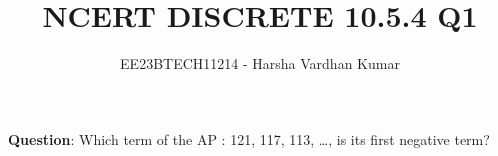 \documentclass[journal,12pt,twocolumn]{IEEEtran}
\title{NCERT DISCRETE 10.5.4 Q1}
\author{EE23BTECH11214 - Harsha Vardhan Kumar}
\begin{document}
\maketitle
\textbf{Question}:
Which term of the AP : 121, 117, 113, \ldots, is its first negative
term?\\
\end{document}
